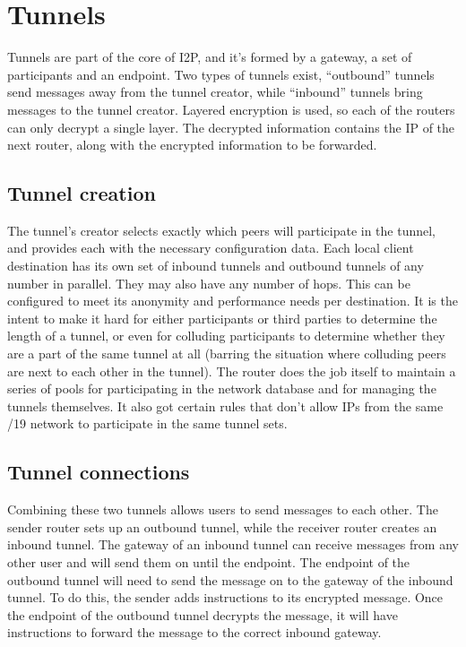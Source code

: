 \documentclass[a4paper,twocolumn,12pt]{article}
\begin{document}
\section{Tunnels} \label{sec:tunnels}

Tunnels are part of the core of I2P, and it's formed by a gateway, a set of
participants and an endpoint. Two types of tunnels exist, ``outbound'' tunnels
send messages away from the tunnel creator, while ``inbound'' tunnels bring
messages to the tunnel creator.
Layered encryption is used, so each of the routers can only decrypt a single
layer. The decrypted information contains the IP of the next router, along with
the encrypted information to be forwarded.

\subsection{Tunnel creation}
The tunnel's creator selects exactly which peers will participate in the tunnel,
and provides each with the necessary configuration data. Each local client destination
has its own set of inbound tunnels and outbound tunnels of any number in parallel.
They may also have any number of hops. This can be configured to meet its anonymity and
performance needs per destination. It is the intent to make it hard for either participants or
third parties to determine the length of a tunnel, or even for colluding participants
to determine whether they are a part of the same tunnel at all (barring the situation
where colluding peers are next to each other in the tunnel). The router does the job itself
to maintain a series of pools for participating in the network database and for managing the
tunnels themselves. It also got certain rules that don't allow IPs from the same /19 network to
participate in the same tunnel sets.

\subsection{Tunnel connections}
Combining these two tunnels allows users to send messages to each other. The
sender router sets up an outbound tunnel, while the receiver router creates an
inbound tunnel. The gateway of an inbound tunnel can receive messages from any
other user and will send them on until the endpoint. The endpoint of the
outbound tunnel will need to send the message on to the gateway of the inbound
tunnel. To do this, the sender adds instructions to its encrypted message. Once
the endpoint of the outbound tunnel decrypts the message, it will have
instructions to forward the message to the correct inbound gateway.
\end{document}
